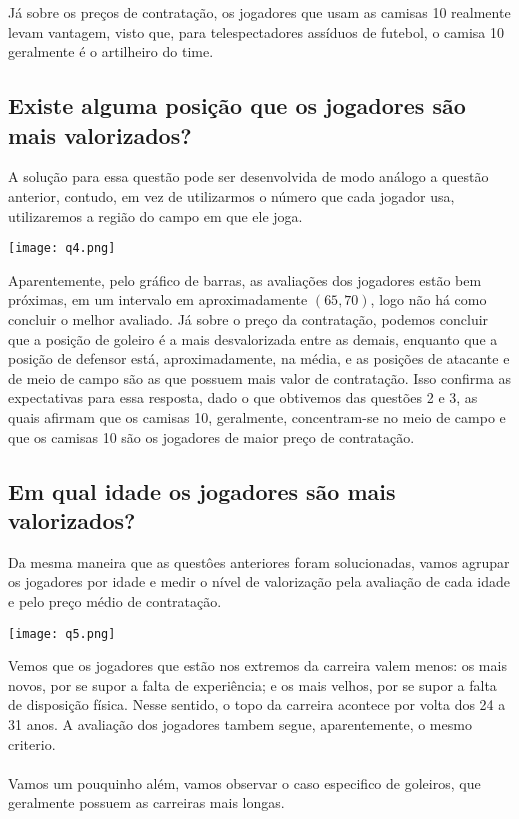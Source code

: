 \documentclass[12pt]{article}
\begin{document}
Já sobre os preços de contratação, os jogadores que usam as camisas 10 realmente levam vantagem, visto que, para telespectadores assíduos de futebol, o camisa 10 geralmente é o artilheiro do time.

\subsection{Existe alguma posição que os jogadores são mais valorizados?}

A solução para essa questão pode ser desenvolvida de modo análogo a questão anterior, contudo, em vez de utilizarmos o número que cada jogador usa, utilizaremos a região do campo em que ele joga.

\texttt{[image: q4.png]}

Aparentemente, pelo gráfico de barras, as avaliações dos jogadores estão bem próximas, em um intervalo em aproximadamente $(65,70)$, logo não há como concluir o melhor avaliado. Já sobre o preço da contratação, podemos concluir que a posição de goleiro é a mais desvalorizada entre as demais, enquanto que a posição de defensor está, aproximadamente, na média, e as posições de atacante e de meio de campo são as que possuem mais valor de contratação. Isso confirma as expectativas para essa resposta, dado o que obtivemos das questões 2 e 3, as quais afirmam que os camisas 10, geralmente, concentram-se no meio de campo e que os camisas 10 são os jogadores de maior preço de contratação.

\subsection{Em qual idade os jogadores são mais valorizados?}
Da mesma maneira que as questôes anteriores foram solucionadas, vamos agrupar os jogadores por idade e medir o nível de valorização pela avaliação de cada idade e pelo preço médio de contratação.

\texttt{[image: q5.png]}


Vemos que os jogadores que estão nos extremos da carreira valem menos: os mais novos, por se supor a falta de experiência; e os mais velhos, por se supor a falta de disposição física. Nesse sentido, o topo da carreira acontece por volta dos 24 a 31 anos. A avaliação dos jogadores tambem segue, aparentemente, o mesmo criterio.
\\
\\
Vamos um pouquinho além, vamos observar o caso especifico de goleiros, que geralmente possuem as carreiras mais longas.
\end{document}
